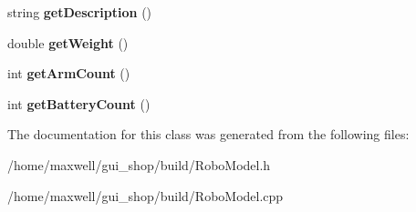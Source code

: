 \begin{DoxyCompactItemize}
\item 
string {\bfseries get\+Description} ()\hypertarget{classRoboModel_adffed46f73dfb49c02adabf96f91ebb4}{}\label{classRoboModel_adffed46f73dfb49c02adabf96f91ebb4}

\item 
double {\bfseries get\+Weight} ()\hypertarget{classRoboModel_a86dc373993b37f0c33c00feafc8d6ffa}{}\label{classRoboModel_a86dc373993b37f0c33c00feafc8d6ffa}

\item 
int {\bfseries get\+Arm\+Count} ()\hypertarget{classRoboModel_ab366b831c341280e04d0855c0bcdbe9a}{}\label{classRoboModel_ab366b831c341280e04d0855c0bcdbe9a}

\item 
int {\bfseries get\+Battery\+Count} ()\hypertarget{classRoboModel_a6074b5258f50030f658883c5626e3ed8}{}\label{classRoboModel_a6074b5258f50030f658883c5626e3ed8}

\end{DoxyCompactItemize}


The documentation for this class was generated from the following files\+:\begin{DoxyCompactItemize}
\item 
/home/maxwell/gui\+\_\+shop/build/Robo\+Model.\+h\item 
/home/maxwell/gui\+\_\+shop/build/Robo\+Model.\+cpp\end{DoxyCompactItemize}

